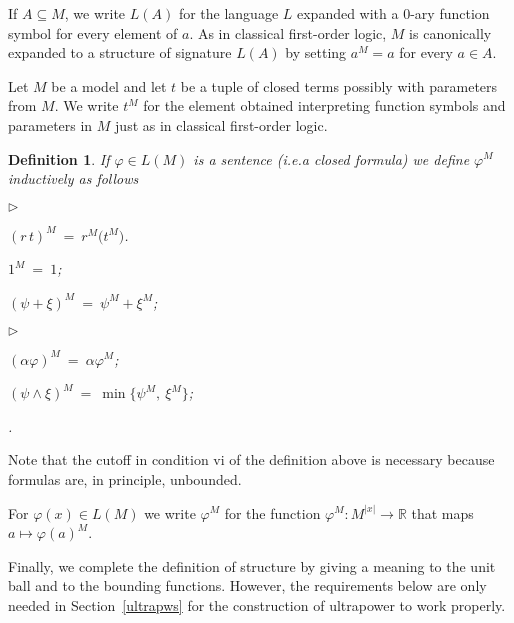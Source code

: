 \documentclass[12pt,letterpaper,oneside,reqno]{amsart}
\newcommand{\mylabel}[1]{{#1}\hfill}
\renewenvironment{itemize}
  {\begin{list}{$\triangleright$}{%
   \setlength{\parskip}{0mm}
   \setlength{\topsep}{.2\baselineskip}
   \setlength{\rightmargin}{0mm}
   \setlength{\listparindent}{0mm}
   \setlength{\itemindent}{0mm}
   \setlength{\labelwidth}{3ex}
   \setlength{\itemsep}{.2\baselineskip}
   \setlength{\parsep}{.2\baselineskip}
   \setlength{\partopsep}{0mm}
   \setlength{\labelsep}{1ex}
   \setlength{\leftmargin}{\labelwidth+\labelsep}
   \let\makelabel\mylabel}}{%
   \end{list}}
\theoremstyle{plain}
\newtheorem{definition}[theorem]{Definition}
\theoremstyle{remark}
\begin{document}
If $A\subseteq M$, we write $L(A)$ for the language $L$ expanded with a $0$-ary function symbol for every element of $a$.
As in classical first-order logic, $M$ is canonically expanded to a structure of signature $L(A)$ by setting $a^M=a$ for every $a\in A$.

Let $M$ be a model and let $t$ be a tuple of closed terms possibly with parameters from $M$.
We write $t^M$ for the element obtained interpreting function symbols and parameters in $M$ just as in classical first-order logic.

\begin{definition}\label{def_semantic}
If $\varphi\in L(M)$ is a sentence (i.e.\@ a closed formula) we define $\varphi^M$ inductively as follows

\begin{minipage}[t]{.4\textwidth}
\begin{itemize}
\item[i.] $(r\,t)^M\ =\  r^M\big(t^M\big)$.
\item[ii.] $1^M\ =\ 1$;
\item[iii.] $(\psi+\xi)^M\ =\ \psi^M+\xi^M$;
\end{itemize}
\end{minipage}
\begin{minipage}[t]{.59\textwidth}
\begin{itemize}
\item[iv.] $(\alpha\varphi)^M\ =\ \alpha\varphi^M$;
\item[v.] $(\psi\wedge\xi)^M\ =\ \min\big\{\psi^M,\ \xi^M\big\}$; 
\item[vi.] \noindent{}.
\end{itemize}
\end{minipage}
\end{definition}
\medskip

Note that the cutoff in condition vi of the definition above is necessary because formulas are, in principle, unbounded.

For $\varphi(x)\in L(M)$ we write $\varphi^M$ for the function $\varphi^M:M^{|x|}\to{\mathds R}$ that maps $a\mapsto\varphi(a)^M$.

Finally, we complete the definition of structure by giving a meaning to the unit ball and to the bounding functions.
However, the requirements below are only needed in Section~\ref{ultrapws} for the construction of ultrapower to work properly.
\end{document}
